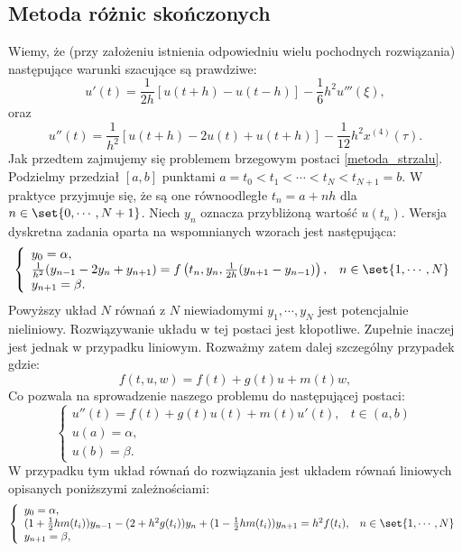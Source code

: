 \subsection{Metoda różnic skończonych} \label{subsection-boundary-theory-finite-differences}
Wiemy, że (przy założeniu istnienia odpowiedniu wielu pochodnych rozwiązania) następujące warunki szacujące są prawdziwe:
\begin{equation}\label{roznice_skoncz_I}
u'(t) = \frac{1}{2h}[u(t+h) - u(t-h)] - \frac{1}{6}h^2u'''(\xi),
\end{equation}
oraz 
\begin{equation}\label{roznice_skoncz_II}
u''(t) = \frac{1}{h^2}[u(t+h) - 2u(t) + u(t+h)] - \frac{1}{12}h^2x^{(4)}(\tau).
\end{equation}
Jak przedtem zajmujemy się problemem brzegowym postaci \eqref{metoda_strzalu}. Podzielmy przedział $[a,b]$ punktami $ a=t_0<t_1<\cdots<t_N<t_{N+1}=b $. W praktyce przyjmuje się, że są one równoodległe $t_n = a + nh$ dla $n \in \set{0,\cdots,N+1}$. Niech $y_n$ oznacza przybliżoną wartość $u(t_n)$. Wersja dyskretna zadania oparta na wspomnianych wzorach jest następująca:
$$
\left\{\begin{array}{ll}
y_0 = \alpha, & \\
\frac{1}{h^2}(y_{n-1}-2y_n + y_{n+1}) = f\left(t_n,y_n,\frac{1}{2h}(y_{n+1} - y_{n-1})\right),& n \in \set{1,\cdots,N} \\
y_{n+1} = \beta.
\end{array}\right. 
$$
Powyższy układ $N$ równań z $N$ niewiadomymi $y_1,\cdots,y_N$ jest potencjalnie nieliniowy. Rozwiązywanie układu w tej postaci jest kłopotliwe. Zupełnie inaczej jest jednak w przypadku liniowym. Rozważmy zatem dalej szczególny przypadek gdzie:
$$
f(t,u,w) =f(t) +  g(t) u + m(t) w,
$$
Co pozwala na sprowadzenie naszego problemu do następującej postaci:
\begin{equation}
\left\{\begin{array}{ll}
u''(t)=f(t) + g(t) u(t) + m(t) u'(t), & t \in (a,b) \\
u(a)= \alpha, & \\
u(b)= \beta.
\end{array}\right.
\end{equation}
W przypadku tym układ równań do rozwiązania jest układem równań liniowych opisanych poniższymi zależnościami:
\begin{equation}\label{zagadnienie_liniowe}
\left\{\begin{array}{ll}
y_0 = \alpha, & \\
(1+ \frac{1}{2}h m(t_i))y_{n-1} - (2+ h^2 g(t_i))y_n + (1- \frac{1}{2}h m(t_i))y_{n+1} = h^2 f(t_i) ,& n \in \set{1,\cdots,N} \\
y_{n+1} = \beta,
\end{array}\right. 
\end{equation}
